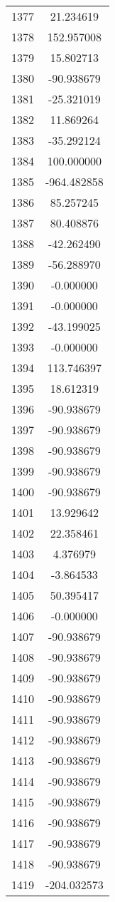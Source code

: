 \documentclass[12pt]{article}
\begin{document}
\begin{longtable}{@{}cc@{}}
1377 & 21.234619 \\
1378 & 152.957008 \\
1379 & 15.802713 \\
1380 & -90.938679 \\
1381 & -25.321019 \\
1382 & 11.869264 \\
1383 & -35.292124 \\
1384 & 100.000000 \\
1385 & -964.482858 \\
1386 & 85.257245 \\
1387 & 80.408876 \\
1388 & -42.262490 \\
1389 & -56.288970 \\
1390 & -0.000000 \\
1391 & -0.000000 \\
1392 & -43.199025 \\
1393 & -0.000000 \\
1394 & 113.746397 \\
1395 & 18.612319 \\
1396 & -90.938679 \\
1397 & -90.938679 \\
1398 & -90.938679 \\
1399 & -90.938679 \\
1400 & -90.938679 \\
1401 & 13.929642 \\
1402 & 22.358461 \\
1403 & 4.376979 \\
1404 & -3.864533 \\
1405 & 50.395417 \\
1406 & -0.000000 \\
1407 & -90.938679 \\
1408 & -90.938679 \\
1409 & -90.938679 \\
1410 & -90.938679 \\
1411 & -90.938679 \\
1412 & -90.938679 \\
1413 & -90.938679 \\
1414 & -90.938679 \\
1415 & -90.938679 \\
1416 & -90.938679 \\
1417 & -90.938679 \\
1418 & -90.938679 \\
1419 & -204.032573 \\

\end{longtable}
\end{document}
